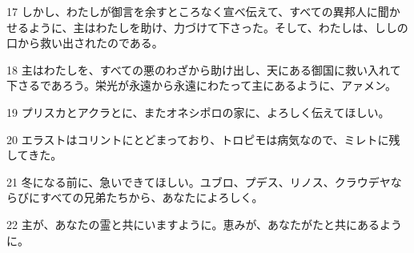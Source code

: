 \par 17 しかし、わたしが御言を余すところなく宣べ伝えて、すべての異邦人に聞かせるように、主はわたしを助け、力づけて下さった。そして、わたしは、ししの口から救い出されたのである。
\par 18 主はわたしを、すべての悪のわざから助け出し、天にある御国に救い入れて下さるであろう。栄光が永遠から永遠にわたって主にあるように、アァメン。
\par 19 プリスカとアクラとに、またオネシポロの家に、よろしく伝えてほしい。
\par 20 エラストはコリントにとどまっており、トロピモは病気なので、ミレトに残してきた。
\par 21 冬になる前に、急いできてほしい。ユブロ、プデス、リノス、クラウデヤならびにすべての兄弟たちから、あなたによろしく。
\par 22 主が、あなたの霊と共にいますように。恵みが、あなたがたと共にあるように。


